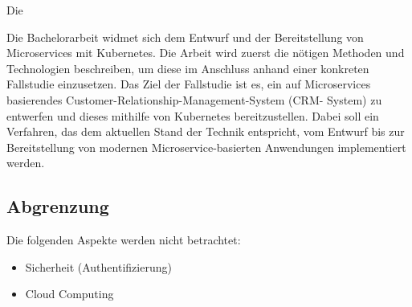 Die 


Die Bachelorarbeit widmet sich dem Entwurf und der Bereitstellung von Microservices mit
Kubernetes. Die Arbeit wird zuerst die nötigen Methoden und Technologien beschreiben, um
diese im Anschluss anhand einer konkreten Fallstudie einzusetzen. Das Ziel der Fallstudie
ist es, ein auf Microservices basierendes Customer-Relationship-Management-System (CRM-
System) zu entwerfen und dieses mithilfe von Kubernetes bereitzustellen. Dabei soll ein
Verfahren, das dem aktuellen Stand der Technik entspricht, vom Entwurf bis zur Bereitstellung
von modernen Microservice-basierten Anwendungen implementiert werden.

\subsection{Abgrenzung}
Die folgenden Aspekte werden nicht betrachtet:
\begin{itemize}
\item Sicherheit (Authentifizierung)
\item Cloud Computing
\end{itemize}
